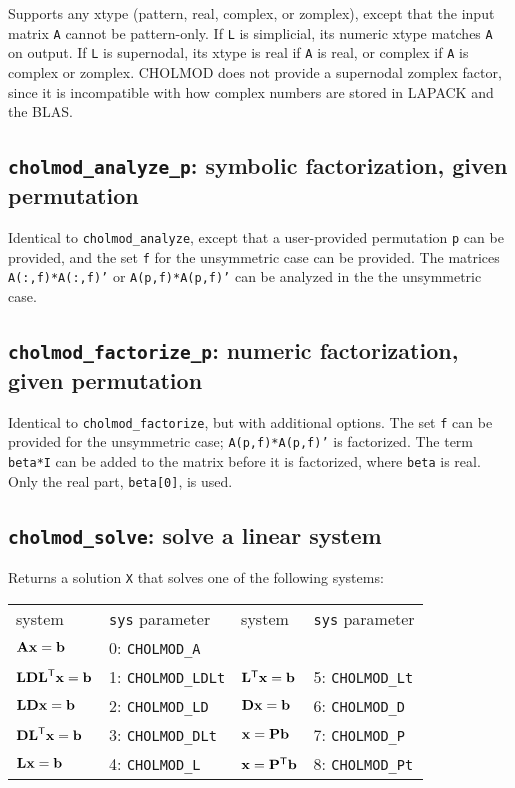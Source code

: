 \documentclass[11pt]{article}
\newcommand{\m}[1]{{\bf{#1}}}       %
\newcommand{\tr}{^{\sf T}}          %
\begin{document}
Supports any xtype (pattern, real, complex, or zomplex), except that the
input matrix {\tt A} cannot be pattern-only.  If {\tt L} is simplicial, its numeric
xtype matches {\tt A} on output.  If {\tt L} is supernodal, its xtype is real if {\tt A} is
real, or complex if {\tt A} is complex or zomplex.  CHOLMOD does not provide
a supernodal zomplex factor, since it is incompatible with how complex numbers are
stored in LAPACK and the BLAS.

\newpage \subsection{{\tt cholmod\_analyze\_p}: symbolic factorization, given permutation}


Identical to {\tt cholmod\_analyze}, except that a user-provided
permutation {\tt p} can be provided, and the set {\tt f} for the unsymmetric case
can be provided.  The matrices {\tt A(:,f)*A(:,f)'} or {\tt A(p,f)*A(p,f)'}
can be analyzed in the the unsymmetric case.

\subsection{{\tt cholmod\_factorize\_p}: numeric factorization, given permutation}


Identical to {\tt cholmod\_factorize}, but with additional options.
The set {\tt f} can be provided for the unsymmetric case;
{\tt A(p,f)*A(p,f)'} is factorized.  The term {\tt beta*I} can be added to
the matrix before it is factorized, where {\tt beta} is real.
Only the real part, {\tt beta[0]}, is used.

\newpage \subsection{{\tt cholmod\_solve}: solve a linear system}


Returns a solution {\tt X} that solves one of the following systems:

\begin{tabular}{ll|ll}
	\hline
	system			    & {\tt sys} parameter & system		    & {\tt sys} parameter \\
	$\m{Ax}=\m{b}$		    & 0: {\tt CHOLMOD\_A}	&			    &			\\
	$\m{LDL}\tr\m{x}=\m{b}$	    & 1: {\tt CHOLMOD\_LDLt}	& $\m{L}\tr\m{x}=\m{b}$	    & 5: {\tt CHOLMOD\_Lt}	\\
	$\m{LDx}=\m{b}$		    & 2: {\tt CHOLMOD\_LD}	& $\m{Dx}=\m{b}$	    & 6: {\tt CHOLMOD\_D}	\\
	$\m{DL}\tr\m{x}=\m{b}$	    & 3: {\tt CHOLMOD\_DLt}	& $\m{x}=\m{Pb}$	    & 7: {\tt CHOLMOD\_P}	\\
	$\m{Lx}=\m{b}$		    & 4: {\tt CHOLMOD\_L}	& $\m{x}=\m{P}\tr\m{b}$	    & 8: {\tt CHOLMOD\_Pt}	\\
	\hline
\end{tabular}
\end{document}
